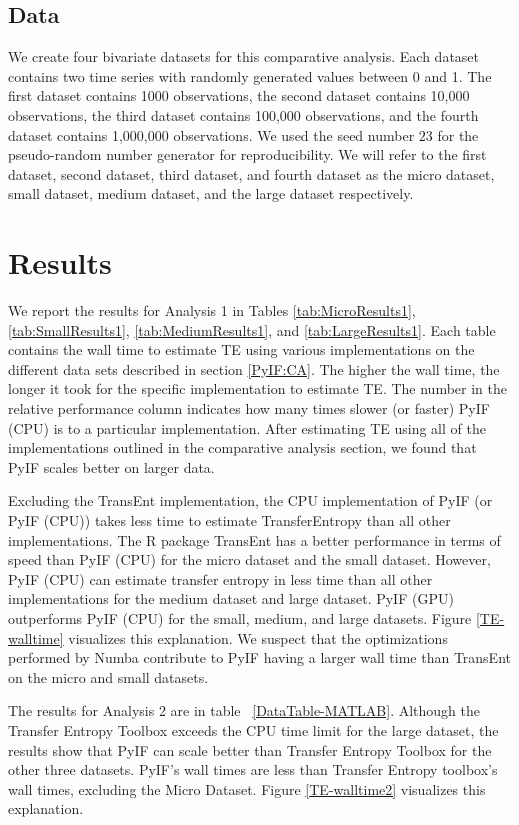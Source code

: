 \subsection{Data}

We create four bivariate datasets for this comparative analysis. Each dataset contains two time series with randomly generated values between 0 and 1. The first dataset contains 1000 observations, the second dataset contains 10,000 observations, the third dataset contains 100,000 observations, and the fourth dataset contains 1,000,000 observations.  We used the seed number  \(23\) for the pseudo-random number generator for reproducibility. We will refer to the first dataset, second dataset, third dataset, and fourth dataset as the micro dataset, small dataset, medium dataset, and the large dataset respectively.


\section{Results}

We report the results for Analysis 1 in Tables \ref{tab:MicroResults1},  \ref{tab:SmallResults1}, \ref{tab:MediumResults1}, and \ref{tab:LargeResults1}.  Each table contains the wall time to estimate TE using various implementations on the different data sets described in section \ref{PyIF:CA}.  The higher the wall time, the longer it took for the specific implementation to estimate TE.  The number in the relative performance column indicates how many times slower (or faster) PyIF (CPU) is to a particular implementation.  After estimating TE using all of the implementations outlined in the comparative analysis section, we found that PyIF scales better on larger data.  

Excluding the TransEnt implementation, the CPU implementation of PyIF (or PyIF (CPU)) takes less time to estimate TransferEntropy than all other implementations. The R package TransEnt has a better performance in terms of speed than PyIF (CPU) for the micro dataset and the small dataset. However, PyIF (CPU) can estimate transfer entropy in less time than all other implementations for the medium dataset and large dataset. PyIF (GPU) outperforms PyIF (CPU) for the small, medium, and large datasets. Figure \ref{TE-walltime} visualizes this explanation. We suspect that the optimizations performed by Numba contribute to PyIF having a larger wall time than TransEnt on the micro and small datasets.

The results for Analysis 2 are in table ~\ref{DataTable-MATLAB}.  Although the Transfer Entropy Toolbox exceeds the CPU time limit for the large dataset, the results show that PyIF can scale better than Transfer Entropy Toolbox for the other three datasets. PyIF's wall times are less than Transfer Entropy toolbox's wall times, excluding the Micro Dataset.  Figure \ref{TE-walltime2} visualizes this explanation.


